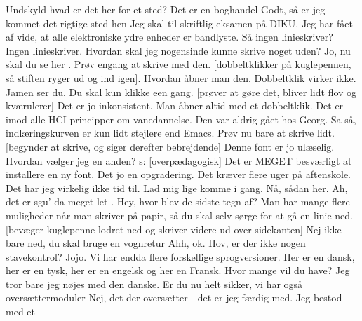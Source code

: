 \documentclass[a4paper,11pt]{article}
\begin{document}
  
\begin{sketch}

      Undskyld hvad er det her for et sted?
      Det er en boghandel
      Godt, så er jeg kommet det rigtige sted hen
      Jeg skal til skriftlig eksamen på DIKU. Jeg har fået af vide, at
alle elektroniske ydre enheder er bandlyste.
      Så ingen linieskriver?
      Ingen linieskriver. Hvordan skal jeg nogensinde kunne skrive noget uden?
      Jo, nu skal du se her . Prøv engang at skrive med den.
[dobbeltklikker på kuglepennen, så stiften ryger ud
  og ind igen]. Hvordan åbner man den. Dobbeltklik virker ikke.
      Jamen ser du. Du skal kun klikke een gang.
[prøver at gøre det, bliver lidt flov og kværulerer]  Det er
jo inkonsistent. Man åbner altid med et dobbeltklik. Det er imod alle
HCI-principper om vanedannelse. Den var aldrig gået hos Georg.
      Sa så, indlæringskurven er kun lidt stejlere end Emacs. Prøv
nu bare at skrive lidt.
      [begynder at skrive, og siger derefter bebrejdende] Denne font
er jo ulæselig. Hvordan vælger jeg en anden?
s:      [overpædagogisk] Det er MEGET besværligt at installere en ny
font. Det jo en opgradering. Det kræver flere uger på aftenskole.
      Det har jeg virkelig ikke tid til. Lad mig lige komme i
gang. Nå, sådan her. Ah,
det er sgu' da meget let . Hey, hvor blev
de sidste tegn af?
      Man har mange flere muligheder når man skriver på papir, så du
skal selv sørge for at gå en linie ned.
[bevæger kuglepenne lodret ned og skriver videre ud over sidekanten]
      Nej ikke bare ned, du skal bruge en vognretur 
      Ahh, ok.  Hov, er der ikke nogen stavekontrol?
     Jojo. Vi har endda flere forskellige sprogversioner. Her er en
dansk, her er en tysk, her er en engelsk og her en Fransk. Hvor mange
vil du have? 
      Jeg tror bare jeg nøjes med den danske.
      Er du nu helt sikker, vi har også oversættermoduler 
      Nej, det der oversætter - det er jeg færdig med. Jeg bestod med et

\end{sketch}
\end{document}
